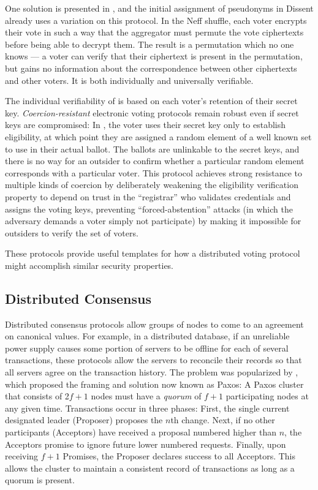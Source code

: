     One solution is presented in \cite{neff}, and the initial assignment of
    pseudonyms in Dissent already uses a variation on this protocol. In the Neff
    shuffle, each voter encrypts their vote in such a way that the aggregator
    must permute the vote ciphertexts before being able to decrypt them. The
    result is a permutation which no one knows --- a voter can verify that their
    ciphertext is present in the permutation, but gains no information about the
    correspondence between other ciphertexts and other voters. It is both
    individually and universally verifiable.

    The individual verifiability of \cite{neff} is based on each
    voter's retention of their secret key. \emph{Coercion-resistant} electronic
    voting protocols remain robust even if secret keys are compromised: In
    \cite{juels_coercion-resistant_2005}, the voter uses their secret key only
    to establish eligibility, at which point they are assigned a random element
    of a well known set to use in their actual ballot. The ballots are
    unlinkable to the secret keys, and there is no way for an outsider to
    confirm whether a particular random element corresponds with a particular
    voter. This protocol achieves strong resistance to multiple kinds of
    coercion by deliberately weakening the eligibility verification property to
    depend on trust in the ``registrar'' who validates credentials and assigns
    the voting keys, preventing ``forced-abstention'' attacks (in which the
    adversary demands a voter simply not participate) by making it impossible
    for outsiders to verify the set of voters.

    These protocols provide useful templates for how a distributed voting
    protocol might accomplish similar security properties.

  \subsection{Distributed Consensus}
    Distributed consensus protocols allow groups of nodes to come to an
    agreement on canonical values. For example, in a distributed database, if an
    unreliable power supply causes some portion of servers to be offline for
    each of several transactions, these protocols allow the
    servers to reconcile their records so that all servers agree on the
    transaction history. The problem was popularized by
    \cite{paxos}, which proposed the framing and solution now
    known as Paxos: A Paxos cluster that consists of 2$f+1$ nodes must have a
    \emph{quorum} of $f + 1$ participating nodes at any given time.
    Transactions occur in three phases: First, the single current designated
    leader (Proposer) proposes the $n$th change. Next, if no other participants
    (Acceptors) have received a proposal numbered higher than $n$, the Acceptors
    promise to ignore future lower numbered requests.  Finally, upon receiving
    $f+1$ Promises, the Proposer declares success to all Acceptors. This allows
    the cluster to maintain a consistent record of transactions as long as a
    quorum is present.


